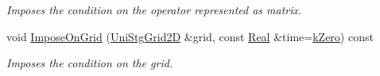 \begin{DoxyCompactItemize}
\begin{DoxyCompactList}\small\item\em Imposes the condition on the operator represented as matrix. \end{DoxyCompactList}\item 
void \hyperlink{classmtk_1_1RobinBCDescriptor2D_ac9564bc46c196cbf4720a0e4b93da8b0}{Impose\+On\+Grid} (\hyperlink{classmtk_1_1UniStgGrid2D}{Uni\+Stg\+Grid2\+D} \&grid, const \hyperlink{group__c01-roots_gac080bbbf5cbb5502c9f00405f894857d}{Real} \&time=\hyperlink{group__c01-roots_ga59a451a5fae30d59649bcda274fea271}{k\+Zero}) const 
\begin{DoxyCompactList}\small\item\em Imposes the condition on the grid. \end{DoxyCompactList}\end{DoxyCompactItemize}
